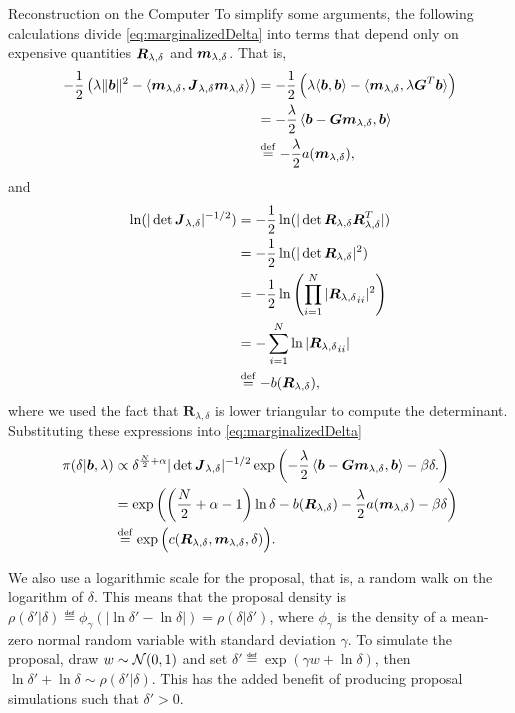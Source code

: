 \begin{chapter}{Reconstruction on the Computer}
To  simplify some arguments, the following calculations divide \eqref{eq:marginalizedDelta} into terms that depend only on expensive quantities $\mbox{\boldmath$R$}_{\lambda,\delta}$ and $\mbox{\boldmath$m$}_{\lambda,\delta}$. 
That is,
\begin{align}
    -\frac12 \left(\lambda \|\mbox{\boldmath$b$}\|^2- \langle \mbox{\boldmath$m$}_{\lambda,\delta},\mbox{\boldmath$J$}_{\lambda,\delta}\mbox{\boldmath$m$}_{\lambda,\delta}\rangle \right)
    &= -\frac12 \left(\lambda \langle\mbox{\boldmath$b$},\mbox{\boldmath$b$}\rangle- \langle \mbox{\boldmath$m$}_{\lambda,\delta},\lambda \mbox{\boldmath$G$}^T\mbox{\boldmath$b$}\rangle \right)\nonumber \\
    &= -\frac\lambda 2 \left\langle\mbox{\boldmath$b$} - \mbox{\boldmath$G$}\mbox{\boldmath$m$}_{\lambda,\delta},\mbox{\boldmath$b$}\right\rangle \nonumber\\
    &\stackrel{\rm def}{=} -\frac \lambda 2a(\mbox{\boldmath$m$}_{\lambda,\delta}), \label{eq:aConst}
\end{align}
and
\begin{align}
  \ln(|\det \mbox{\boldmath$J$}_{\lambda,\delta}|^{-1/2})
  &= -\frac 12\ln(|\det \mbox{\boldmath$R$}_{\lambda,\delta}\mbox{\boldmath$R$}_{\lambda,\delta}^T|)\nonumber\\
  &= -\frac 12\ln(|\det \mbox{\boldmath$R$}_{\lambda,\delta}|^2)\nonumber\\
  &= -\frac 12\ln\left(\prod_{i=1}^N |{\mbox{\boldmath$R$}_{\lambda,\delta}}_{ii}|^2\right) \nonumber\\
  &= -\sum_{i=1}^N\ln|{\mbox{\boldmath$R$}_{\lambda,\delta}}_{ii}|\nonumber\\
  &\stackrel{\rm def}{=} -b(\mbox{\boldmath$R$}_{\lambda,\delta}), 
\end{align}
where we used the fact that $\bm R_{\lambda,\delta}$ is lower triangular to compute the determinant.
Substituting these expressions into \eqref{eq:marginalizedDelta}
\begin{align}
  \pi(\delta|\mbox{\boldmath$b$},\lambda)
    &\propto \delta^{\frac N2+\alpha}|\det \mbox{\boldmath$J$}_{\lambda,\delta}|^{-1/2}\exp\left( -\frac\lambda 2 \left\langle\mbox{\boldmath$b$} - \mbox{\boldmath$G$}\mbox{\boldmath$m$}_{\lambda,\delta},\mbox{\boldmath$b$}\right\rangle -\beta\delta.  \right) \nonumber \\
    &= \exp\left( \left(\frac N2 +\alpha - 1\right)\ln\delta - b(\mbox{\boldmath$R$}_{\lambda,\delta}) -\frac \lambda 2 a(\mbox{\boldmath$m$}_{\lambda,\delta}) -\beta\delta  \right)\nonumber \\
    &\stackrel{\rm def}{=} \exp\Big( c(\mbox{\boldmath$R$}_{\lambda,\delta},\mbox{\boldmath$m$}_{\lambda,\delta},\delta)  \Big). \label{eq:deltaConstant}
\end{align}

We also use a logarithmic scale for the proposal, that is, a random walk on the logarithm of $\delta$.
This means that the proposal density is $\rho(\delta'|\delta) \eqdef \phi_\gamma(|\ln \delta' - \ln \delta|) =  \rho(\delta|\delta')$, where $\phi_\gamma$ is the density of a mean-zero normal random variable with standard deviation $\gamma$.
To simulate the proposal, draw $w\sim \mathcal{N}(0,1)$ and set $\delta'\eqdef \exp(\gamma w+\ln \delta)$, then $\ln\delta'+\ln\delta \sim \rho(\delta'|\delta)$. 
This has the added benefit of producing proposal simulations such that $\delta'>0$.


\end{chapter}
